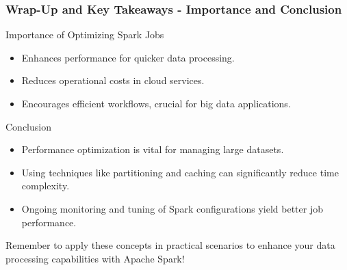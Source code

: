 \documentclass{beamer}
\begin{document}
\begin{frame}[fragile]
    \frametitle{Wrap-Up and Key Takeaways - Importance and Conclusion}
    \begin{block}{Importance of Optimizing Spark Jobs}
        \begin{itemize}
            \item Enhances performance for quicker data processing.
            \item Reduces operational costs in cloud services.
            \item Encourages efficient workflows, crucial for big data applications.
        \end{itemize}
    \end{block}
    
    \begin{block}{Conclusion}
        \begin{itemize}
            \item Performance optimization is vital for managing large datasets.
            \item Using techniques like partitioning and caching can significantly reduce time complexity.
            \item Ongoing monitoring and tuning of Spark configurations yield better job performance.
        \end{itemize}
        Remember to apply these concepts in practical scenarios to enhance your data processing capabilities with Apache Spark!
    \end{block}
\end{frame}
\end{document}
